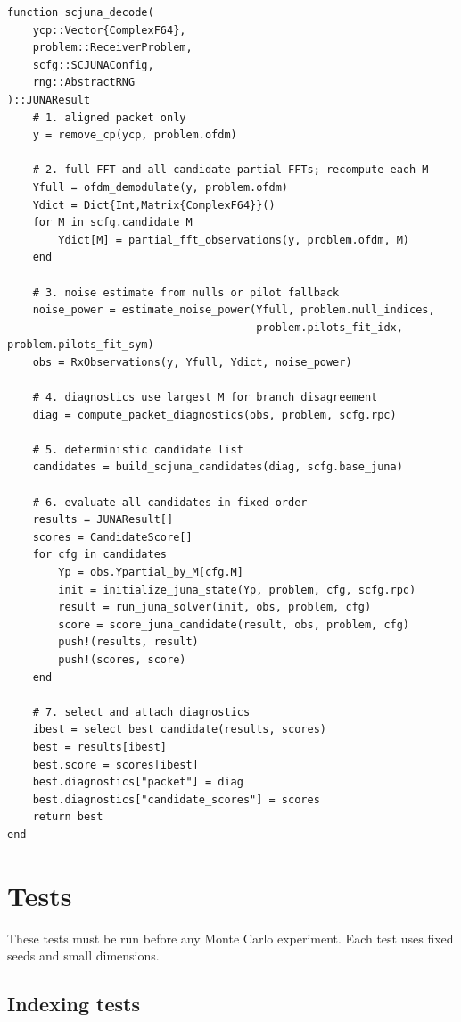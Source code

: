 \documentclass[11pt]{article}
\begin{document}
\begin{lstlisting}
function scjuna_decode(
    ycp::Vector{ComplexF64},
    problem::ReceiverProblem,
    scfg::SCJUNAConfig,
    rng::AbstractRNG
)::JUNAResult
    # 1. aligned packet only
    y = remove_cp(ycp, problem.ofdm)

    # 2. full FFT and all candidate partial FFTs; recompute each M
    Yfull = ofdm_demodulate(y, problem.ofdm)
    Ydict = Dict{Int,Matrix{ComplexF64}}()
    for M in scfg.candidate_M
        Ydict[M] = partial_fft_observations(y, problem.ofdm, M)
    end

    # 3. noise estimate from nulls or pilot fallback
    noise_power = estimate_noise_power(Yfull, problem.null_indices,
                                       problem.pilots_fit_idx, problem.pilots_fit_sym)
    obs = RxObservations(y, Yfull, Ydict, noise_power)

    # 4. diagnostics use largest M for branch disagreement
    diag = compute_packet_diagnostics(obs, problem, scfg.rpc)

    # 5. deterministic candidate list
    candidates = build_scjuna_candidates(diag, scfg.base_juna)

    # 6. evaluate all candidates in fixed order
    results = JUNAResult[]
    scores = CandidateScore[]
    for cfg in candidates
        Yp = obs.Ypartial_by_M[cfg.M]
        init = initialize_juna_state(Yp, problem, cfg, scfg.rpc)
        result = run_juna_solver(init, obs, problem, cfg)
        score = score_juna_candidate(result, obs, problem, cfg)
        push!(results, result)
        push!(scores, score)
    end

    # 7. select and attach diagnostics
    ibest = select_best_candidate(results, scores)
    best = results[ibest]
    best.score = scores[ibest]
    best.diagnostics["packet"] = diag
    best.diagnostics["candidate_scores"] = scores
    return best
end
\end{lstlisting}

\clearpage
\section{Tests}

These tests must be run before any Monte Carlo experiment. Each test uses fixed seeds and small dimensions.

\subsection{Indexing tests}
\end{document}
